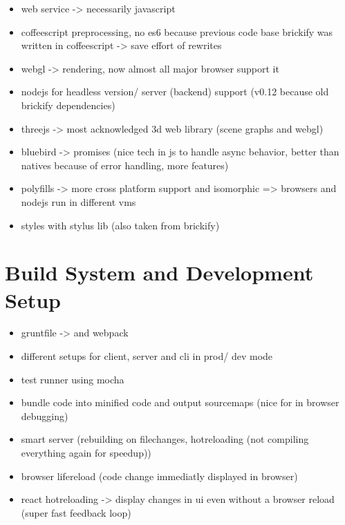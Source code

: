 \documentclass[../ClassicThesis.tex]{subfiles}
\begin{document}
\begin{itemize}
\item web service -> necessarily javascript
\item coffeescript preprocessing, no es6 because previous code base
  brickify was written in coffeescript -> save effort of rewrites
\item webgl -> rendering, now almost all major browser support it
\item nodejs for headless version/ server (backend) support (v0.12
  because old brickify dependencies)
\item threejs -> most acknowledged 3d web library (scene graphs and
  webgl)
\item bluebird -> promises (nice tech in js to handle async behavior,
  better than natives because of error handling, more features)
\item polyfills -> more cross platform support and isomorphic =>
  browsers and nodejs run in different vms
\item styles with stylus lib (also taken from brickify)
\end{itemize}

\section{Build System and Development Setup}

\begin{itemize}
\item gruntfile -> and webpack
\item different setups for client, server and cli in prod/ dev mode
\item test runner using mocha
\item bundle code into minified code and output sourcemaps (nice for
  in browser debugging)
\item smart server (rebuilding on filechanges, hotreloading (not
  compiling everything again for speedup))
\item browser lifereload (code change immediatly displayed in browser)
\item react hotreloading -> display changes in ui even without a
  browser reload (super fast feedback loop)
\end{itemize}
\end{document}
